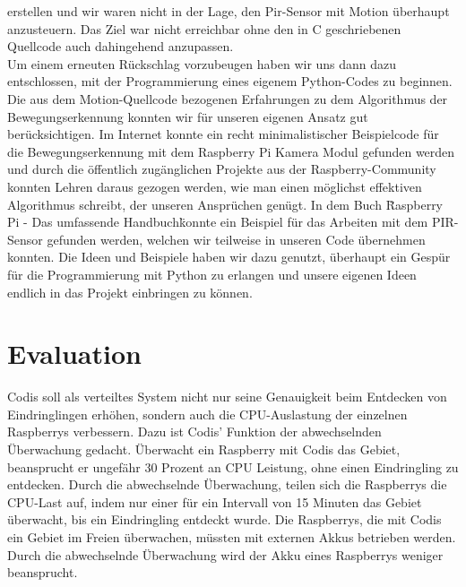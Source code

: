 \documentclass[journal]{IEEEtran}
\begin{document}
erstellen und wir waren nicht in der Lage, den Pir-Sensor mit Motion überhaupt anzusteuern. Das Ziel war nicht erreichbar ohne den in C geschriebenen Quellcode auch dahingehend anzupassen. \\ Um einem erneuten Rückschlag vorzubeugen haben wir uns dann dazu entschlossen, mit der Programmierung eines eigenem Python-Codes zu beginnen. Die aus dem Motion-Quellcode bezogenen Erfahrungen zu dem Algorithmus der Bewegungserkennung konnten wir für unseren eigenen Ansatz gut berücksichtigen. Im Internet konnte ein recht minimalistischer Beispielcode für die Bewegungserkennung mit dem Raspberry Pi Kamera Modul gefunden werden\cite{motioncode} und durch die öffentlich zugänglichen Projekte aus der Raspberry-Community konnten Lehren daraus gezogen werden, wie man einen möglichst effektiven Algorithmus schreibt, der unseren Ansprüchen genügt. In dem Buch \"Raspberry Pi - Das umfassende Handbuch\" konnte ein Beispiel für das Arbeiten mit dem PIR-Sensor gefunden werden\cite[S. 495]{Raspberry}, welchen wir teilweise in unseren Code übernehmen konnten. Die Ideen und Beispiele haben wir dazu genutzt, überhaupt ein Gespür für die Programmierung mit Python zu erlangen und unsere eigenen Ideen endlich in das Projekt einbringen zu können. \\



\section{Evaluation}

Codis soll als verteiltes System nicht nur seine Genauigkeit beim Entdecken von Eindringlingen erhöhen, sondern auch die CPU-Auslastung der einzelnen Raspberrys verbessern. Dazu ist Codis' Funktion der abwechselnden Überwachung gedacht. Überwacht ein Raspberry mit Codis das Gebiet, beansprucht er ungefähr 30 Prozent an CPU Leistung, ohne einen Eindringling zu entdecken. Durch die abwechselnde Überwachung, teilen sich die Raspberrys die CPU-Last auf, indem nur einer für ein Intervall von 15 Minuten das Gebiet überwacht, bis ein Eindringling entdeckt wurde. Die Raspberrys, die mit Codis ein Gebiet im Freien überwachen, müssten mit externen Akkus betrieben werden. Durch die abwechselnde Überwachung wird der Akku eines Raspberrys weniger beansprucht.
\end{document}
